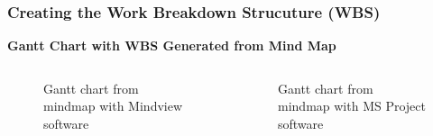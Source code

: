 \documentclass[aspectratio=169]{beamer}
\begin{document}
\begin{frame}
\frametitle{Creating the Work Breakdown Strucuture (WBS)}
\textbf{Gantt Chart with WBS Generated from Mind Map}
\begin{columns}
\begin{figure}
\caption{Gantt chart from mindmap with Mindview software}
\end{figure}
\begin{figure}
\caption{Gantt chart from mindmap with MS Project software}
\end{figure}
\end{columns}
\end{frame}

\end{document}
